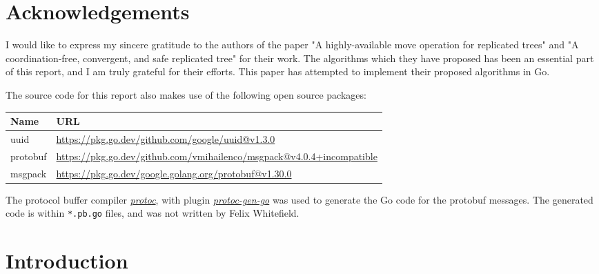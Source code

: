 \documentclass[12pt]{report}
\begin{document}
\chapter*{Acknowledgements}

I would like to express my sincere gratitude to the authors of the paper "A highly-available move operation for replicated
trees"\cite{9563274} and "A coordination-free, convergent, and safe replicated tree"\cite{https://doi.org/10.48550/arxiv.2103.04828} for their work. The algorithms which they have proposed has been an essential part of this report, and I am truly grateful for their efforts. This paper has attempted to implement their proposed algorithms in Go. \par 

\hspace{2cm}

The source code for this report also makes use of the following open source packages: 
\begin{table}[h]
    \centering
    \begin{tabularx}{\textwidth}{|l|X|}
    \hline
    \textbf{Name} & \textbf{URL} \\ \hline
    uuid     &  \scriptsize{\url{https://pkg.go.dev/github.com/google/uuid@v1.3.0}}  \\ 
    protobuf     &   \scriptsize{\url{https://pkg.go.dev/github.com/vmihailenco/msgpack@v4.0.4+incompatible}}  \\
    msgpack     &    \scriptsize{\url{https://pkg.go.dev/google.golang.org/protobuf@v1.30.0}} \\ \hline
    \end{tabularx}
\end{table}

The protocol buffer compiler \href{https://github.com/protocolbuffers/protobuf#protocol-compiler-installation}{\textit{protoc}}, with plugin \href{https://github.com/protocolbuffers/protobuf-go}{\textit{protoc-gen-go}} was used to generate the Go code for the protobuf messages. The generated code is within \texttt{*.pb.go} files, and was not written by Felix Whitefield. \par



\newpage
\tableofcontents

\newpage

\setcounter{page}{1}

\chapter{Introduction}
\end{document}
